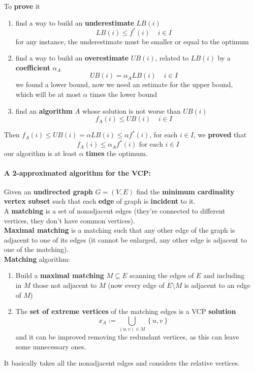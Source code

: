 \documentclass[11pt]{article}
\begin{document}
	To \textbf{prove} it
	\begin{enumerate}
		\item find a way to build an \textbf{underestimate} $LB(i)$
		$$ LB(i) \leq f^\ast (i) \;\;\;\; i \in I $$
		for any instance, the underestimate must be smaller or equal to the optimum
		\item find a way to build an \textbf{overestimate} $UB(i)$, related to $LB(i)$ by a \textbf{coefficient} $\alpha_A$
		$$ UB(i) = \alpha_A LB(i) \;\;\;\; i \in I $$
		we found a lower bound, now we need an estimate for the upper bound, which will be at most $\alpha$ times the lower bound
		\item find an \textbf{algorithm} $A$ whose solution is not worse than $UB(i)$
		$$ f_A (i) \leq UB(i) \;\;\;\; i \in I $$
	\end{enumerate}
	Then $f_A (i) \leq UB(i) = \alpha LB(i) \leq \alpha f^\ast (i)$, for each $i \in I$, we \textbf{proved} that
	$$ f_A (i) \leq \alpha_A f^\ast (i) \text{ for each } i \in I $$
	our algorithm is at least $\alpha$ \textbf{times} the optimum.\\
	
	\newpage
	
	\paragraph{A 2-approximated algorithm for the VCP:} Given an \textbf{undirected graph} $G = (V , E )$ find the \textbf{minimum cardinality vertex subset} such that each \textbf{edge} of graph is \textbf{incident} to it.\\
	
	A \textbf{matching} is a set of nonadjacent edges (they're connected to different vertices, they don't have common vertices).\\
	\textbf{Maximal matching} is a matching such that any other edge of the graph is adjacent to one of its edges (it cannot be enlarged, any other edge is adjacent to one of the matching).\\
	
	\textbf{Matching} algorithm:
	\begin{enumerate}
		\item Build a \textbf{maximal matching} $M \subseteq E$ scanning the edges of $E$ and including in $M$ those not adjacent to $M$ (now every edge of $E \setminus M$ is adjacent to an edge of $M$)
		\item The \textbf{set of extreme vertices} of the matching edges is a VCP \textbf{solution}
		$$ x_A := \bigcup_{(u,v) \in M} \left\{u,v\right\}$$
		and it can be improved removing the redundant vertices, as this can leave some unnecessary ones.
	\end{enumerate}
	It basically takes all the nonadjacent edges and considers the relative vertices.\\
	
\end{document}
